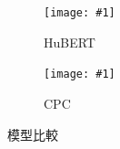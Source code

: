 {{}  %
{

\newcommand{\jeffheightt}[1]{\texttt{[image: \#1]}}

\begin{figure}
     \centering
     \begin{subfigure}{\textwidth}  %
         \centering
         \jeffheightt{figures/hubert-50-joint-byprob--new1.png}
         \caption{HuBERT}
         \label{fig:ch3-heatmap-model--hubert-50-joint-byprob}
     \end{subfigure}
     \vfill

     \begin{subfigure}{\textwidth}  %
         \centering
         \jeffheightt{figures/cpc-50-joint-byprob.png}
         \caption{CPC}
         \label{fig:ch3-heatmap-model--cpc-50-joint-byprob}
     \end{subfigure}

     \caption{模型比較}
     \label{fig:ch3-heatmap-model-comparison--part1}
\end{figure}


\begin{figure}
    \ContinuedFloat
     \centering
     

\end{figure}}}
